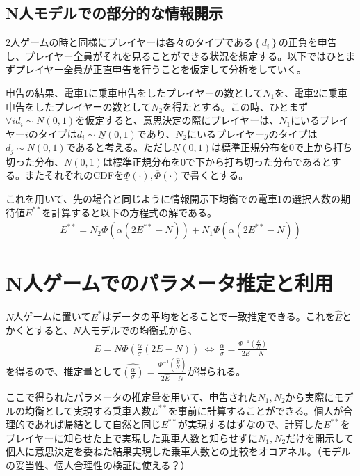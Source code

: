 \documentclass{jsarticle}
\begin{document}
\subsection{N人モデルでの部分的な情報開示}
$2$人ゲームの時と同様にプレイヤーは各々のタイプである$\left\{ d_i \right\}$の正負を申告し、プレイヤー全員がそれを見ることができる状況を想定する。以下ではひとまずプレイヤー全員が正直申告を行うことを仮定して分析をしていく。

申告の結果、電車$1$に乗車申告をしたプレイヤーの数として$N_1$を、電車$2$に乗車申告をしたプレイヤーの数として$N_2$を得たとする。この時、ひとまず$\forall i d_i \sim N(0,1)$を仮定すると、意思決定の際にプレイヤーは、$N_1$にいるプレイヤー$i$のタイプは$d_i \sim \underline{N}(0,1)$であり、$N_2$にいるプレイヤー$j$のタイプは$d_j \sim \overline{N}(0,1)$であると考える。ただし$\underline{N}(0,1)$は標準正規分布を$0$で上から打ち切った分布、$\overline{N}(0,1)$は標準正規分布を$0$で下から打ち切った分布であるとする。またそれぞれのCDFを$\underline{\Phi}(\cdot), \overline{\Phi}(\cdot)$で書くとする。

これを用いて、先の場合と同じように情報開示下均衡での電車$1$の選択人数の期待値$E^{**}$を計算すると以下の方程式の解である。
\begin{align*}
	E^{**} = N_2 \overline{\Phi} \left(\alpha (2 E^{**} - N)\right) + N_1 \underline{\Phi} \left(\alpha (2 E^{**} - N)\right)
\end{align*}

\section{N人ゲームでのパラメータ推定と利用}
$N$人ゲームに置いて$E^*$はデータの平均をとることで一致推定できる。これを$\hat{E}$とかくとすると、$N$人モデルでの均衡式から、
\begin{align*}
	E = N\Phi \left(\frac{\alpha}{\sigma}(2 E - N)\right)\ \Leftrightarrow\ \frac{\alpha}{\sigma} = \frac{\Phi^{-1}\left(\frac{E}{N}\right)}{2E - N}
\end{align*}
を得るので、推定量として$\hat{\left(\frac{\alpha}{\sigma}\right)} = \frac{\Phi^{-1}\left(\frac{\hat{E}}{N}\right)}{2\hat{E} - N}$が得られる。

ここで得られたパラメータの推定量を用いて、申告された$N_1, N_2$から実際にモデルの均衡として実現する乗車人数$E^{**}$を事前に計算することができる。個人が合理的であれば帰結として自然と同じ$E^{**}$が実現するはずなので、計算した$E^{**}$をプレイヤーに知らせた上で実現した乗車人数と知らせずに$N_1, N_2$だけを開示して個人に意思決定を委ねた結果実現した乗車人数との比較をオコアネル。（モデルの妥当性、個人合理性の検証に使える？）
\end{document}
